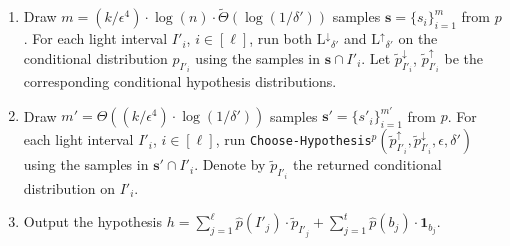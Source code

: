 \documentclass[10pt]{article}
\theoremstyle{definition}
\numberwithin{equation}{section}
\newcommand{\algorithml}[1]{{\normalfont\texttt{#1}}}
\newcommand{\bm}{\mathbf} %
\newcommand{\eps}{\epsilon}
\newcommand{\wh}[1]{{\widehat{#1}}}
\newcommand{\AND}{{\mathrm{L^{\uparrow}}}}
\newcommand{\ANI}{{\mathrm{L^{\downarrow}}}}
\begin{document}
\begin{algorithm}
\begin{enumerate}
%


\item Draw $m =  (k/\eps^4) \cdot \log(n) \cdot \tilde{\Theta}(\log(1/\delta'))$
samples $\mathbf{s} = \{s_i\}_{i=1}^m$ from $p$. For each light interval $I'_i$, $i \in [\ell]$, run both
$\ANI_{\delta'}$ and $\AND_{\delta'}$ on the conditional distribution $p_{I'_i}$ using the samples in $\mathbf{s} \cap I'_i$. 
Let   $\widetilde{p}^{\downarrow}_{I'_i}$, $\widetilde{p}^{\uparrow}_{I'_i}$  be the corresponding conditional hypothesis distributions.

%


\item Draw $m' = \Theta((k/\eps^4)\cdot \log(1/\delta'))$ samples  $\mathbf{s'} = \{s'_i\}_{i=1}^{m'}$ from $p$.
For each light interval $I'_i$, $i \in [\ell]$,
run  \algorithml{Choose-Hypothesis}$^p(\widetilde{p}^{\uparrow}_{I'_i},\widetilde{p}^{\downarrow}_{I'_i}, \eps,\delta')$
using the samples in $\mathbf{s'} \cap I'_i$.
Denote by $\widetilde{p}_{I'_i}$ the returned conditional distribution on $I'_i$.

\item Output the hypothesis $h = \sum_{j=1}^{\ell} \wh{p}(I'_j) \cdot \widetilde{p}_{I'_j} + \sum_{j=1}^t \wh{p}(b_j) \cdot {\bm 1}_{b_j}$.
\end{enumerate}
\caption{\algorithml{Learn-kmodal-simple}}\label{alg:learn-kmodal-simple}
\end{algorithm}
\end{document}

